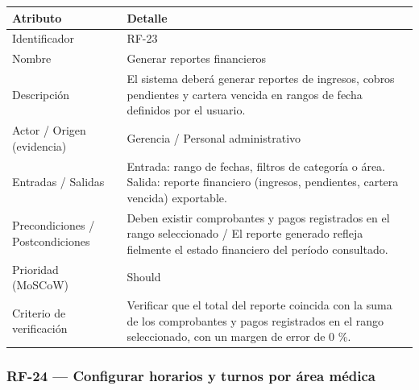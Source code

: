 \documentclass[11pt,a4paper]{article}
\begin{document}
	\begin{longtable}{p{} p{}}
		
		\toprule
		\textbf{Atributo} & \textbf{Detalle} \\
		\midrule
		\endhead
		
		Identificador & RF-23 \\
		Nombre & Generar reportes financieros \\
		Descripción & El sistema deberá generar reportes de ingresos, cobros pendientes y cartera vencida en rangos de fecha definidos por el usuario. \\
		Actor / Origen (evidencia) & Gerencia / Personal administrativo \\
		Entradas / Salidas & Entrada: rango de fechas, filtros de categoría o área. Salida: reporte financiero (ingresos, pendientes, cartera vencida) exportable. \\
		Precondiciones / Postcondiciones & Deben existir comprobantes y pagos registrados en el rango seleccionado / El reporte generado refleja fielmente el estado financiero del período consultado. \\
		Prioridad (MoSCoW) & Should \\
		Criterio de verificación & Verificar que el total del reporte coincida con la suma de los comprobantes y pagos registrados en el rango seleccionado, con un margen de error de 0 \%. \\
		\bottomrule
	\end{longtable}
	
	\subsubsection{RF-24 --- Configurar horarios y turnos por área médica}
	
\end{document}
